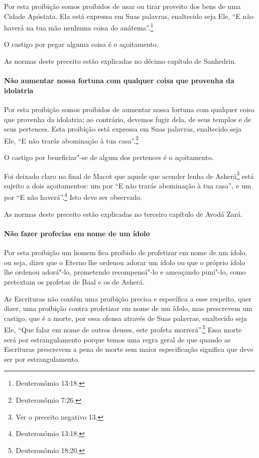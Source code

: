\begin{multicols}{2}
Por esta proibição somos proibidos de usar ou tirar proveito dos bens de
uma Cidade Apóstata. Ela está expressa em Suas palavras, enaltecido seja
Ele, ``E não haverá na tua mão nenhuma coisa do anátema''.\footnote{Deuteronômio
13:18.}

O castigo por pegar alguma coisa é o açoitamento.

As normas deste preceito estão explicadas no décimo capítulo de Sanhedrin\starr.

\paragraph{Não aumentar nossa fortuna com qualquer coisa que provenha da idolatria}

Por esta proibição somos proibidos de aumentar nossa fortuna com
qualquer coisa que provenha da idolatria; ao contrário, devemos fugir
dela, de seus templos e de seus pertences. Esta proibição está expressa
em Suas palavras, enaltecido seja Ele, ``E não trarás abominação à tua casa''.\footnote{Deuteronômio 7:26.}

O castigo por beneficiar"-se de algum dos pertences é o açoitamento.

Foi deixado claro no final de Macot\starr{} que aquele que acender lenha de
Asherá\starr\footnote{Ver o preceito negativo 13.} está sujeito a dois açoitamentos: um
por ``E não trarás abominação à tua casa'', e um por ``E não haverá''.\footnote{Deuteronômio 13:18.} Isto deve ser observado.

As normas deste preceito estão explicadas no terceiro capítulo de Avodá Zará\starr.

\paragraph{Não fazer profecias em nome de um ídolo}

Por esta proibição um homem fica proibido de profetizar em nome de um
ídolo, ou seja, dizer que o Eterno lhe ordenou adorar um ídolo ou que o
próprio ídolo lhe ordenou adorá"-lo, prometendo recompensá"-lo e
ameaçando puni"-lo, como pretextam os profetas de Baal\starr{} e os de Asherá\starr.

As Escrituras não contêm uma proibição precisa e específica a esse
respeito, quer dizer, uma proibição contra profetizar em nome de um
ídolo, mas prescrevem um castigo, que é a morte, por essa ofensa através
de Suas palavras, enaltecido seja Ele, ``Que falar em nome de outros
deuses, este profeta morrerá''.\footnote{Deuteronômio 18:20.} Essa morte será por
estrangulamento porque temos uma regra geral de que quando as Escrituras
prescrevem a pena de morte sem maior especificação significa que deve
ser por estrangulamento.


\end{multicols}
